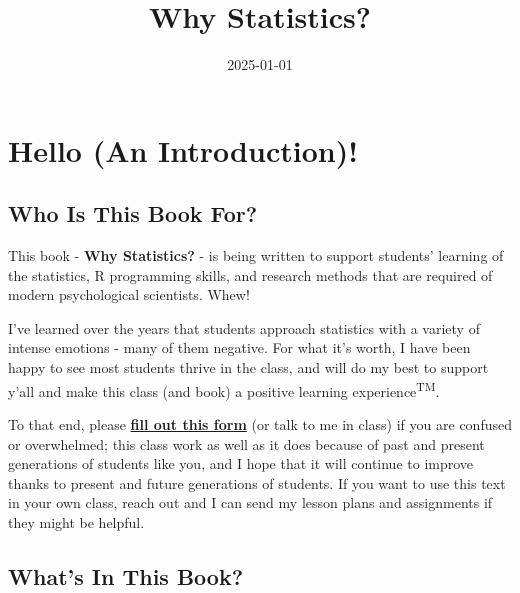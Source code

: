 \documentclass[
  letterpaper,
  DIV=11,
  numbers=noendperiod,
  oneside]{scrreprt}
\title{Why Statistics?}
\author{}
\date{2025-01-01}
\renewcommand*\contentsname{Table of contents}
\newcommand\contentsname{Table of contents}
\begin{document}
\maketitle

\renewcommand*\contentsname{Table of contents}
{
\hypersetup{linkcolor=}
\setcounter{tocdepth}{2}
\tableofcontents
}


\chapter*{Hello (An Introduction)!}\label{hello-an-introduction}


\section*{Who Is This Book For?}\label{who-is-this-book-for}


This book - \textbf{Why Statistics?} - is being written to support
students' learning of the statistics, R programming skills, and research
methods that are required of modern psychological scientists. Whew!

I've learned over the years that students approach statistics with a
variety of intense emotions - many of them negative. For what it's
worth, I have been happy to see most students thrive in the class, and
will do my best to support y'all and make this class (and book) a
positive learning experience\textsuperscript{TM}.

To that end, please
\href{https://docs.google.com/forms/d/e/1FAIpQLSfvY43sN2K7KHVfPi2-lR1jsOqFqj-aFFFYHScBfqhjXy3RRw/viewform?usp=header}{\textbf{fill
out this form}} (or talk to me in class) if you are confused or
overwhelmed; this class work as well as it does because of past and
present generations of students like you, and I hope that it will
continue to improve thanks to present and future generations of
students. If you want to use this text in your own class, reach out and
I can send my lesson plans and assignments if they might be helpful.

\section*{What's In This Book?}\label{whats-in-this-book}
\end{document}
